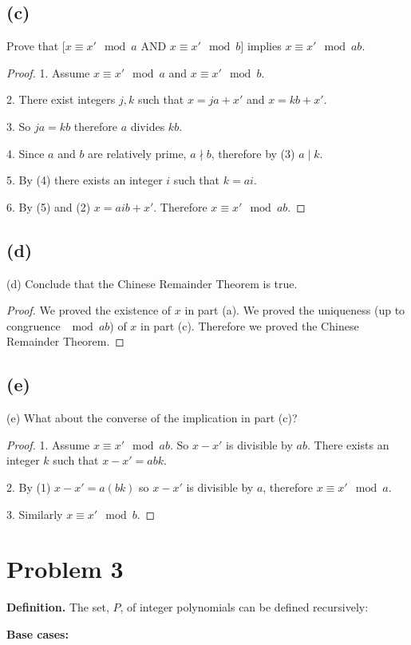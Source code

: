 \documentclass[14pt]{extarticle}
\begin{document}
\subsection{(c)}
Prove that $[x \equiv x' \mod a$ AND $x \equiv x' \mod b]$ implies $x \equiv x' \mod ab$.
\begin{proof}
1. Assume $x \equiv x' \mod a$ and $x \equiv x' \mod b$.

2. There exist integers $j, k$ such that $x = ja + x'$ and $x = kb + x'$.

3. So $ja = kb$ therefore $a$ divides $kb$.

4. Since $a$ and $b$ are relatively prime, $a \nmid b$, therefore by (3) $a \mid k$.

5. By (4) there exists an integer $i$ such that $k = ai$.

6. By (5) and (2) $x = aib + x'$. Therefore $x \equiv x' \mod ab$.
\end{proof}

\subsection{(d)}
(d) Conclude that the Chinese Remainder Theorem is true.
\begin{proof}
We proved the existence of $x$ in part (a). We proved the uniqueness (up to congruence $\mod ab$) of $x$ in part (c). Therefore we proved the Chinese Remainder Theorem.
\end{proof}

\subsection{(e)}
(e) What about the converse of the implication in part (c)?
\begin{proof}
1. Assume $x \equiv x' \mod ab$. So $x - x'$ is divisible by $ab$. There exists an integer $k$ such that $x - x' = abk$.

2. By (1) $x - x' = a(bk)$ so $x - x'$ is divisible by $a$, therefore $x \equiv x' \mod a$.

3. Similarly $x \equiv x' \mod b$.
\end{proof}

\section{Problem 3}
{\bf Definition.} The set, $P$, of integer polynomials can be defined recursively:

{\bf Base cases:}
\end{document}
